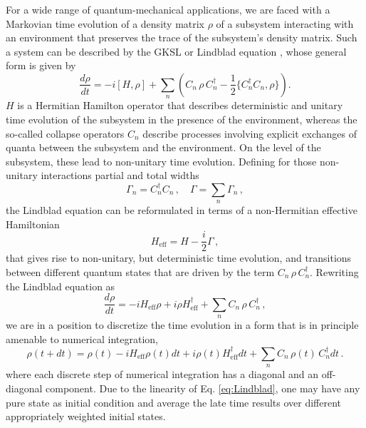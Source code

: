 \documentclass[times,sort&compress,final]{elsarticle}
\begin{document}
For a wide range of quantum-mechanical applications, we are faced with a 
Markovian time evolution of a density matrix $\rho$ of a subsystem 
interacting with an environment that preserves the trace of the subsystem's 
density matrix. 
Such a system can be described by the GKSL or Lindblad equation
\cite{Gorini:1975nb,Lindblad:1975ef}, whose general form is given by 
\begin{equation}  \frac{d\rho}{dt}=-i[H,\rho]+\sum_n 
\left(  C_n\,\rho\,C_n^\dagger-\frac{1}{2}\{C_n^\dagger C_n,\rho\} \right).
\label{eq:Lindblad}
\end{equation}
$H$ is a Hermitian Hamilton operator that describes deterministic and unitary time 
evolution of the subsystem in the presence of the environment, 
whereas the so-called collapse operators $C_n$ describe processes involving 
explicit exchanges of quanta between the subsystem and the environment. 
On the level of the subsystem, these lead to non-unitary time evolution. 
Defining for those non-unitary interactions partial and total widths
\begin{equation}
\Gamma_n=C_n^\dagger C_n\,,\quad 
\Gamma = \sum\limits_n \Gamma_n\,,
\label{eq:width}
\end{equation}
the Lindblad equation can be reformulated in terms of a non-Hermitian effective 
Hamiltonian 
\begin{equation}
H_\text{eff}=H-\frac{i}{2}\Gamma\,,
\label{eq:Heff}
\end{equation}
that gives rise to non-unitary, but deterministic time evolution, and transitions between  
different quantum states that are driven by the term $C_n\,\rho\,C_n^\dagger$.
Rewriting the Lindblad equation as 
\begin{equation}
\frac{d\rho}{dt}=-iH_\text{eff}\rho+i\rho H^\dagger_\text{eff}+\sum_n C_n\,\rho \,C_n^\dagger\,,
\end{equation}
we are in a position to discretize the time evolution in a form that is 
in principle amenable to numerical integration, 
\begin{equation}
\rho(t+dt) = \rho(t)-iH_\text{eff}\rho(t)dt+i\rho(t)H_\text{eff}^\dagger dt+\sum_n C_n\,\rho(t) \,C_n^\dagger dt\,.
\label{eq:discLE}
\end{equation}
where each discrete step of numerical integration has a diagonal and 
an off-diagonal component. 
Due to the linearity of Eq. \eqref{eq:Lindblad}, one may have any pure state 
as initial condition and average the late time results over different appropriately 
weighted initial states. 
\end{document}
